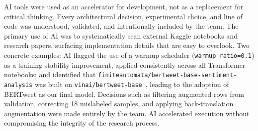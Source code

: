 \documentclass[conference]{IEEEtran}
\begin{document}
AI tools were used as an accelerator for development, not as a replacement for critical thinking. Every architectural decision, experimental choice, and line of code was understood, validated, and intentionally included by the team. 
The primary use of AI was to systematically scan external Kaggle notebooks and research papers, surfacing implementation details that are easy to overlook. Two concrete examples: AI flagged the use of a warmup scheduler (\texttt{warmup\_ratio=0.1}) as a training stability improvement, applied consistently across all Transformer notebooks; and identified that 
\texttt{finiteautomata/bertweet-base-sentiment-
analysis} was built on \texttt{vinai/bertweet-base}~\cite{tripathi_bertweet_kaggle}, leading to the adoption of BERTweet as our final model. Decisions such as filtering augmented rows from validation, correcting 18 mislabeled samples, and applying back-translation augmentation were made entirely by the team. AI accelerated execution without compromising the  integrity of the research process.

\end{document}

